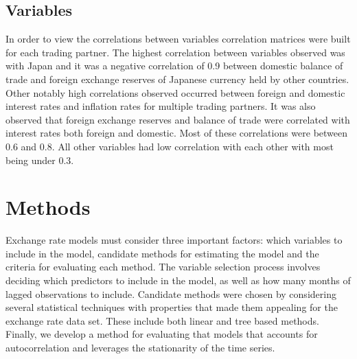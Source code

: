 \documentclass{sig-alternate-05-2015}
\begin{document}

\subsection{Variables}

In order to view the correlations between variables correlation matrices were built for each trading partner. The highest correlation between variables observed was with Japan and it was a negative correlation of 0.9 between domestic balance of trade and foreign exchange reserves of Japanese currency held by other countries. Other notably high correlations observed occurred between foreign and domestic interest rates and inflation rates for multiple trading partners. It was also observed that foreign exchange reserves and balance of trade were correlated with interest rates both foreign and domestic. Most of these correlations were between 0.6 and 0.8. All other variables had low correlation with each other with most being under 0.3.   

\section{Methods}
Exchange rate models must consider three important factors: which variables to include in the model, candidate methods for estimating the model and the criteria for evaluating each method. The variable selection process involves deciding which predictors to include in the model, as well as how many months of lagged observations to include. Candidate methods were chosen by considering several statistical techniques with properties that made them appealing for the exchange rate data set. These include both linear and tree based methods. Finally, we develop a method for evaluating that models that accounts for autocorrelation and leverages the stationarity of the time series.
\end{document}
